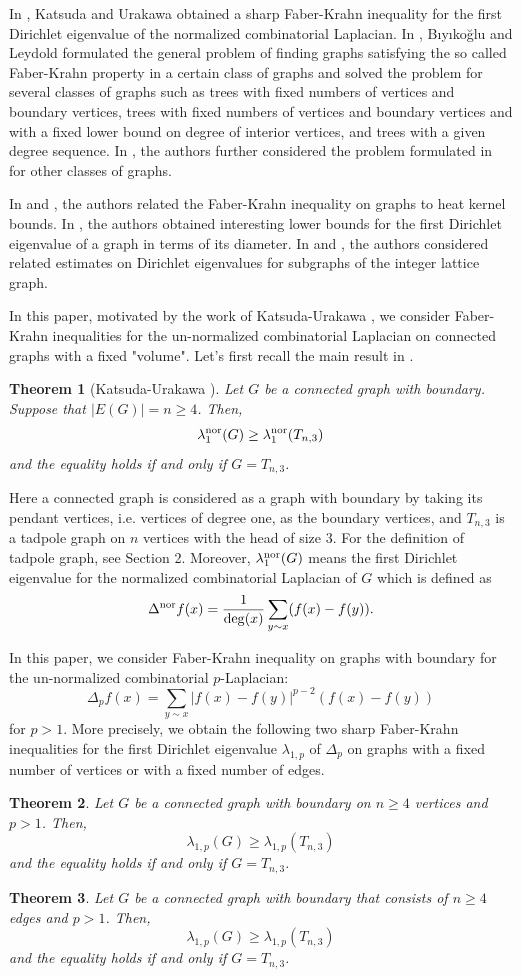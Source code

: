 \documentclass[12pt]{amsart}
\newtheorem{thm}{Theorem}[section]
\theoremstyle{definition}
\theoremstyle{remark}
\numberwithin{equation}{section}
\begin{document}
In \cite{KU}, Katsuda and Urakawa obtained a sharp Faber-Krahn inequality for the first Dirichlet eigenvalue of the normalized combinatorial Laplacian. In \cite{BL}, Bıyıkoğlu and Leydold formulated the general problem of finding graphs satisfying the so called Faber-Krahn property in a certain class of graphs and solved the problem for several classes of graphs such as trees with fixed numbers of vertices and boundary vertices, trees with fixed numbers of vertices and boundary vertices and with a fixed lower bound on degree of interior vertices, and trees with a given degree sequence. In \cite{ZZ12,ZZ13,ZZZ,WH,LLY}, the authors further considered the problem formulated in \cite{BL} for other classes of graphs.

In \cite{DS} and \cite{Ro}, the authors related the Faber-Krahn inequality on graphs to heat kernel bounds. In \cite{LLYZ}, the authors obtained interesting lower bounds for the first Dirichlet eigenvalue of a graph in terms of its diameter. In \cite{BaL} and \cite{HL}, the authors considered related estimates on Dirichlet eigenvalues for subgraphs of the integer lattice graph.

In this paper, motivated by the work of Katsuda-Urakawa \cite{KU}, we consider Faber-Krahn inequalities for the un-normalized combinatorial Laplacian on connected graphs with a fixed "volume". Let's first recall the main result in \cite{KU}.
\begin{thm}[Katsuda-Urakawa \cite{KU}]\label{thm-KU}
Let $G$ be a connected graph with boundary. Suppose that $|E(G)|=n\geq 4$. Then,
$$\lambda_1^{\rm nor}(G)\geq \lambda_1^{\rm nor }(T_{n,3})$$
and the equality holds if and only if $G=T_{n,3}$.
\end{thm}
Here a connected graph is considered as a graph with boundary by taking its pendant vertices, i.e. vertices of degree one, as the boundary vertices, and $T_{n,3}$ is a tadpole graph on $n$ vertices with the head of size $3$. For the definition of tadpole graph, see Section 2. Moreover, $\lambda_1^{\rm nor}(G)$ means the first Dirichlet eigenvalue for the normalized combinatorial Laplacian of $G$ which is defined as
$$\Delta^{\rm nor} f(x)=\frac{1}{\deg(x)}\sum_{y\sim x}(f(x)-f(y)).$$

In this paper, we consider Faber-Krahn inequality on graphs with boundary for the un-normalized combinatorial $p$-Laplacian:
$$\Delta_p f(x)=\sum_{y\sim x}|f(x)-f(y)|^{p-2}(f(x)-f(y))$$
for $p>1$. More precisely, we obtain the following two sharp Faber-Krahn inequalities for the first Dirichlet eigenvalue $\lambda_{1,p}$ of $\Delta_p$ on graphs with a fixed number of vertices or with a fixed number of edges.
\begin{thm}\label{thm-FK-V}
Let $G$ be a connected graph with boundary on $n\geq 4$ vertices and $p>1$. Then,
$$\lambda_{1,p}(G)\geq \lambda_{1,p}(T_{n,3})$$
and the equality holds if and only if $G=T_{n,3}$.
\end{thm}
\begin{thm}\label{thm-FK-E}
Let $G$ be a connected graph with  boundary that consists of $n\geq 4$ edges and $p>1$. Then, $$\lambda_{1,p}(G)\geq \lambda_{1,p}(T_{n,3})$$
and the equality holds if and only if $G=T_{n,3}$.
\end{thm}
\end{document}
